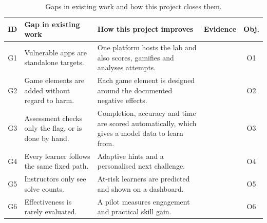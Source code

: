 \begin{table}[!htbp]
\centering
\caption{Gaps in existing work and how this project closes them.}
\label{tab:gaps}
\tablefont
\begin{tabularx}{\linewidth}{@{}c P{4.2cm} L P{2.1cm} c@{}}
\toprule
\textbf{ID} & \textbf{Gap in existing work} & \textbf{How this project improves} & \textbf{Evidence} & \textbf{Obj.} \\
\midrule
G1 & Vulnerable apps are standalone targets. & One platform hosts the lab and also scores, gamifies and analyses attempts. & \cite{Karagiannis2020analysis,OwaspJuiceShop} & O1 \\
G2 & Game elements are added without regard to harm. & Each game element is designed around the documented negative effects. & \cite{Toda2018dark,Almeida2023negative} & O2 \\
G3 & Assessment checks only the flag, or is done by hand. & Completion, accuracy and time are scored automatically, which gives a model data to learn from. & \cite{Chapman2014picoctf,Svabensky2024detecting,Karagiannis2020analysis} & O3 \\
G4 & Every learner follows the same fixed path. & Adaptive hints and a personalised next challenge. & \cite{Streicher2016adaptive,Vykopal2023smart} & O4 \\
G5 & Instructors only see solve counts. & At-risk learners are predicted and shown on a dashboard. & \cite{Svabensky2024detecting} & O5 \\
G6 & Effectiveness is rarely evaluated. & A pilot measures engagement and practical skill gain. & \cite{Svabensky2020what} & O6 \\
\bottomrule
\end{tabularx}
\end{table}
